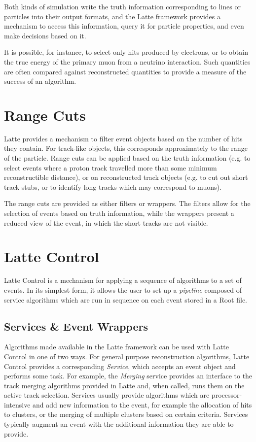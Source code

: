 Both kinds of simulation write the truth information corresponding to lines or particles into their output formats, and the Latte framework provides a mechanism to access this information, query it for particle properties, and even make decisions based on it.

It is possible, for instance, to select only hits produced by electrons, or to obtain the true energy of the primary muon from a neutrino interaction. Such quantities are often compared against reconstructed quantities to provide a measure of the success of an algorithm.

\section{Range Cuts}
Latte provides a mechanism to filter event objects based on the number of hits they contain. For track-like objects, this corresponds approximately to the range of the particle. Range cuts can be applied based on the truth information (e.g. to select events where a proton track travelled more than some minimum reconstructible distance), or on reconstructed track objects (e.g. to cut out short track stubs, or to identify long tracks which may correspond to muons).

The range cuts are provided as either filters or wrappers. The filters allow for the selection of events based on truth information, while the wrappers present a reduced view of the event, in which the short tracks are not visible.

\section{Latte Control}
Latte Control is a mechanism for applying a sequence of algorithms to a set of events. In its simplest form, it allows the user to set up a \emph{pipeline} composed of service algorithms which are run in sequence on each event stored in a {\sc Root} file.

\subsection{Services \& Event Wrappers}
Algorithms made available in the Latte framework can be used with Latte Control in one of two ways. For general purpose reconstruction algorithms, Latte Control provides a corresponding \emph{Service}, which accepts an event object and performs some task. For example, the \emph{Merging} service provides an interface to the track merging algorithms provided in Latte and, when called, runs them on the active track selection. Services usually provide algorithms which are processor-intensive and add new information to the event, for example the allocation of hits to clusters, or the merging of multiple clusters based on certain criteria. Services typically augment an event with the additional information they are able to provide.

